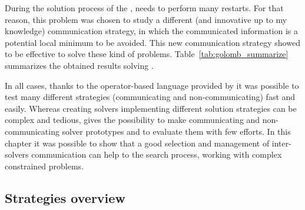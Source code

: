 During the solution process of the \grp{}, \posl{} needs to perform many restarts. For that reason, this problem was chosen to study a different (and innovative up to my knowledge) communication strategy, in which the communicated information is a potential local minimum to be avoided. This new communication strategy showed to be effective to solve these kind of problems. Table~\ref{tab:golomb_summarize} summarizes the obtained results solving \GRP.

\begin{table}[h]
\captionsetup{belowskip=6pt,aboveskip=6pt}
\centering 
\renewcommand{\arraystretch}{1}
\caption{Summarizing results for \GRP{}}
\label{tab:golomb_summarize}
\end{table}

In all cases, thanks to the operator-based language provided by \posl{} it was possible to test many different strategies (communicating and non-communicating) fast and easily. Whereas creating solvers implementing different solution strategies can be complex and tedious, \posl{} gives the possibility to make communicating and non-communicating solver prototypes and to evaluate them with few efforts. In this chapter it was possible to show that a good selection and management of inter-solvers communication can %
help to the search process, working with complex constrained problems.

\subsection{Strategies overview}
